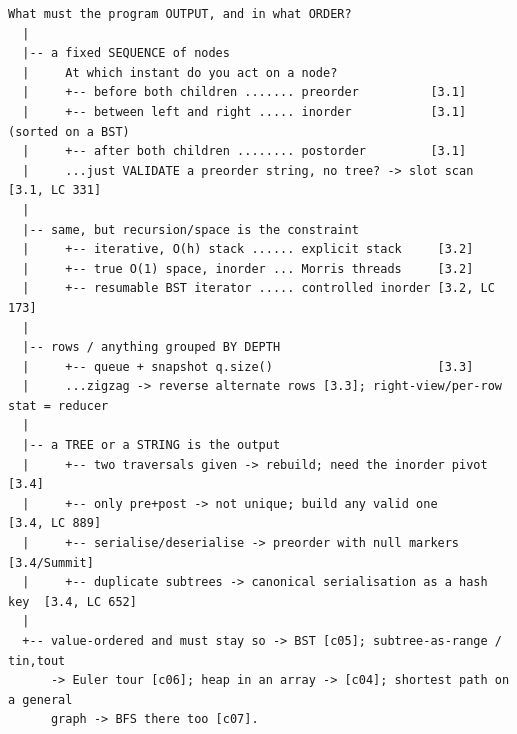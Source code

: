 \begin{lstlisting}[language={}, basicstyle=\ttfamily\small, numbers=none, frame=single]
  What must the program OUTPUT, and in what ORDER?
  |
  |-- a fixed SEQUENCE of nodes
  |     At which instant do you act on a node?
  |     +-- before both children ....... preorder          [3.1]
  |     +-- between left and right ..... inorder           [3.1] (sorted on a BST)
  |     +-- after both children ........ postorder         [3.1]
  |     ...just VALIDATE a preorder string, no tree? -> slot scan [3.1, LC 331]
  |
  |-- same, but recursion/space is the constraint
  |     +-- iterative, O(h) stack ...... explicit stack     [3.2]
  |     +-- true O(1) space, inorder ... Morris threads     [3.2]
  |     +-- resumable BST iterator ..... controlled inorder [3.2, LC 173]
  |
  |-- rows / anything grouped BY DEPTH
  |     +-- queue + snapshot q.size()                       [3.3]
  |     ...zigzag -> reverse alternate rows [3.3]; right-view/per-row stat = reducer
  |
  |-- a TREE or a STRING is the output
  |     +-- two traversals given -> rebuild; need the inorder pivot      [3.4]
  |     +-- only pre+post -> not unique; build any valid one             [3.4, LC 889]
  |     +-- serialise/deserialise -> preorder with null markers          [3.4/Summit]
  |     +-- duplicate subtrees -> canonical serialisation as a hash key  [3.4, LC 652]
  |
  +-- value-ordered and must stay so -> BST [c05]; subtree-as-range / tin,tout
      -> Euler tour [c06]; heap in an array -> [c04]; shortest path on a general
      graph -> BFS there too [c07].
\end{lstlisting}


